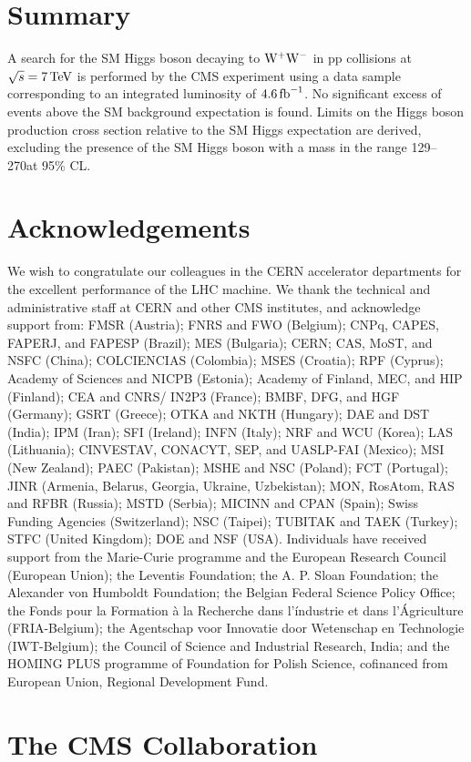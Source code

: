 \documentclass[12pt,twoside,a4paper,cmspaper,final,collab]{cms-tdr}
\begin{document}
\section{Summary}
\label{sec:summary}
A search for the SM Higgs boson decaying to $\mathrm{W^+}{}\mathrm{W^-}$ in pp
collisions at $\sqrt{s} = 7\,\text{Te\hspace{-.08em}V}$ is performed by the CMS experiment
using a data sample corresponding
to an integrated luminosity of $4.6\mbox{\ensuremath{\,\text{fb}^\text{$-$1}}}$. No significant excess of events
above the SM background expectation is found. Limits on
the Higgs boson production cross section relative to the SM Higgs
expectation are derived, excluding the presence of the SM Higgs boson
with a mass in the range 129--270\GeV at 95\% CL.

\section*{Acknowledgements}
We wish to congratulate our colleagues in the CERN accelerator departments for the excellent
performance of the LHC machine. We thank the technical and administrative staff at CERN and other CMS
institutes, and acknowledge support from: FMSR (Austria); FNRS and FWO (Belgium); CNPq, CAPES, FAPERJ,
and FAPESP (Brazil); MES (Bulgaria); CERN; CAS, MoST, and NSFC (China); COLCIENCIAS (Colombia); MSES
(Croatia); RPF (Cyprus); Academy of Sciences and NICPB (Estonia); Academy of Finland, MEC, and HIP
(Finland); CEA and CNRS/ IN2P3 (France); BMBF, DFG, and HGF (Germany); GSRT (Greece); OTKA and NKTH
(Hungary); DAE and DST (India); IPM (Iran); SFI (Ireland); INFN (Italy); NRF and WCU (Korea); LAS
(Lithuania); CINVESTAV, CONACYT, SEP, and UASLP-FAI (Mexico); MSI (New Zealand); PAEC (Pakistan);
MSHE and NSC (Poland); FCT (Portugal); JINR (Armenia, Belarus, Georgia, Ukraine, Uzbekistan); MON,
RosAtom, RAS and RFBR (Russia); MSTD (Serbia); MICINN and CPAN (Spain); Swiss Funding Agencies
(Switzerland); NSC (Taipei); TUBITAK and TAEK (Turkey); STFC (United Kingdom); DOE and NSF (USA).
Individuals have received support from the Marie-Curie programme and the European Research Council
(European Union); the Leventis Foundation; the A. P. Sloan Foundation; the Alexander von Humboldt
Foundation; the Belgian Federal Science Policy Office; the Fonds pour la Formation \`a la Recherche
dans l'\'industrie et dans l'\'Agriculture (FRIA-Belgium); the Agentschap voor Innovatie door Wetenschap
en Technologie (IWT-Belgium); the Council of Science and Industrial Research, India; and the HOMING
PLUS programme of Foundation for Polish Science, cofinanced from European Union, Regional Development
Fund.

\cleardoublepage \appendix\section{The CMS Collaboration \label{app:collab}}\begin{sloppypar}\end{sloppypar}
\end{document}
